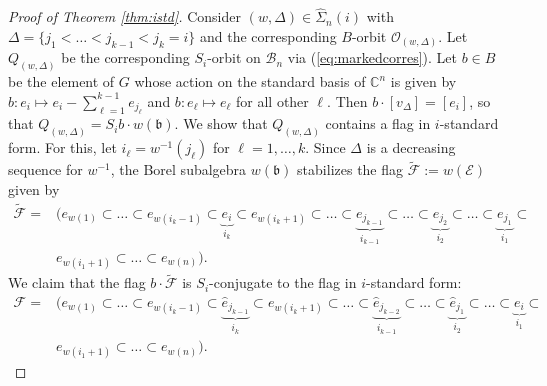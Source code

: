 \documentclass[12pt]{amsart}
\numberwithin{equation}{section}
\theoremstyle{remark}
\theoremstyle{definition}
\newcommand{\fb}{\mbox{${\mathfrak b}$}}
\newcommand{\C}{\mbox{${\mathbb C}$}}
\newcommand{\B}{\mathcal{B}}
\newcommand{\he}{\hat{e}}
\newcommand{\F}{\mathcal{F}}
\begin{document}


\begin{proof}[Proof of Theorem \ref{thm:istd}]
Consider $(w,\Delta)\in\widehat{\Sigma}_{n}(i)$ with $\Delta=\{j_{1}<\dots<j_{k-1}<j_{k}=i\}$ and the corresponding $B$-orbit $\mathcal{O}_{(w,\Delta)}.$  Let $Q_{(w,\Delta)}$ be the corresponding $S_{i}$-orbit on $\B_{n}$ via (\ref{eq:markedcorres}).   Let $b\in B$ be the element of $G$ whose action on the standard basis of $\C^{n}$ is given by $b:e_{i}\mapsto e_{i}-\sum_{\ell=1}^{k-1} e_{j_{\ell}}$ and $b:e_{\ell}\mapsto e_{\ell}$ for all other $\ell$.   Then $b\cdot[v_{\Delta}]=[e_{i}]$, so that $Q_{(w,\Delta)}=S_{i}b\cdot w(\fb)$.  We show that $Q_{(w,\Delta)}$ contains a flag in $i$-standard form.  For this, let $i_{\ell}=w^{-1}(j_{\ell})$ for $\ell=1,\dots, k$.  Since $\Delta$ is a decreasing sequence for $w^{-1}$, the Borel subalgebra $w(\fb)$ stabilizes the flag $\tilde{\F}:=w(\mathcal{E})$ given by
 \begin{equation}\label{eq:firstflag} 
 \begin{split}
 \tilde{\F}=&(e_{w(1)}\subset\dots\subset e_{w(i_{k}-1)}\subset\underbrace{e_{i}}_{i_{k}}\subset e_{w(i_{k}+1)}\subset \dots\subset \underbrace{e_{j_{k-1}}}_{i_{k-1}}\subset
\dots\subset \underbrace{e_{j_{2}}}_{i_{2}}\subset \dots\subset\underbrace{e_{j_{1}}}_{i_{1}}\subset \\ &e_{w(i_{1}+1)}\subset\dots\subset e_{w(n)}).
\end{split}
\end{equation}
We claim that the flag $b\cdot\tilde{\F}$ is $S_{i}$-conjugate to the flag in $i$-standard form:
\begin{equation}\label{eq:secondflag}
\begin{split}
\F=&(e_{w(1)}\subset\dots\subset e_{w(i_{k}-1)}\subset\underbrace{ \he_{j_{k-1}}}_{i_{k}}\subset e_{w(i_{k}+1)}\subset \dots \subset \underbrace{\he_{j_{k-2}}}_{i_{k-1}}\subset \dots \subset \underbrace{\he_{j_{1}}}_{i_{2}}\subset \dots\subset \underbrace{e_{i}}_{i_{1}}\subset\\& e_{w(i_{1}+1)}\subset \dots\subset e_{w(n)}).
\end{split}
\end{equation}

\end{proof}
\end{document}
